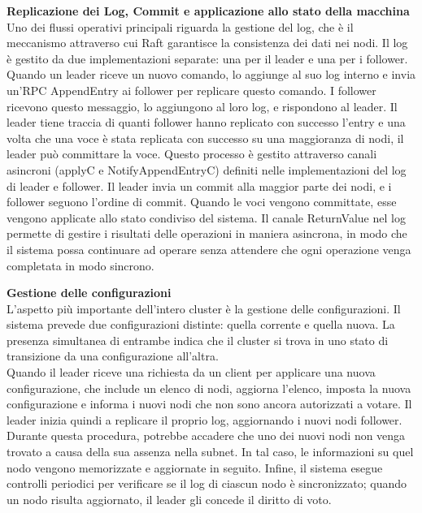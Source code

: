 \textbf{Replicazione dei Log, Commit e applicazione allo stato della macchina}\\
Uno dei flussi operativi principali riguarda la gestione del log, che è il meccanismo attraverso cui Raft garantisce la consistenza dei dati nei nodi. Il log è gestito da due implementazioni separate: una per il leader e una 
per i follower.
Quando un leader riceve un nuovo comando, lo aggiunge al suo log interno e invia un'RPC AppendEntry ai follower per replicare questo comando. I follower ricevono questo messaggio, lo aggiungono al loro log, e rispondono al leader. 
Il leader tiene traccia di quanti follower hanno replicato con successo l'entry e una volta che una voce è stata replicata con successo su una maggioranza di nodi, il leader può committare la voce. Questo processo è gestito 
attraverso canali asincroni (applyC e NotifyAppendEntryC) definiti nelle implementazioni del log di leader e follower. Il leader invia un commit alla maggior parte dei nodi, e i follower seguono l'ordine di commit. 
Quando le voci vengono committate, esse vengono applicate allo stato condiviso del sistema.
Il canale ReturnValue nel log permette di gestire i risultati delle operazioni in maniera asincrona, in modo che il sistema possa continuare ad operare senza attendere che ogni operazione venga completata in modo sincrono.

\textbf{Gestione delle configurazioni}\\
L'aspetto più importante dell'intero cluster è la gestione delle configurazioni. Il sistema prevede due configurazioni distinte: quella corrente e quella nuova. La presenza simultanea di entrambe indica che il cluster si 
trova in uno stato di transizione da una configurazione all'altra.\\
Quando il leader riceve una richiesta da un client per applicare una nuova configurazione, che include un elenco di nodi, aggiorna l'elenco, imposta la nuova configurazione e informa i nuovi nodi che non sono ancora autorizzati
a votare. Il leader inizia quindi a replicare il proprio log, aggiornando i nuovi nodi follower.\\
Durante questa procedura, potrebbe accadere che uno dei nuovi nodi non venga trovato a causa della sua assenza nella subnet. In tal caso, le informazioni su quel nodo vengono memorizzate e aggiornate in seguito. Infine, 
il sistema esegue controlli periodici per verificare se il log di ciascun nodo è sincronizzato; quando un nodo risulta aggiornato, il leader gli concede il diritto di voto.

